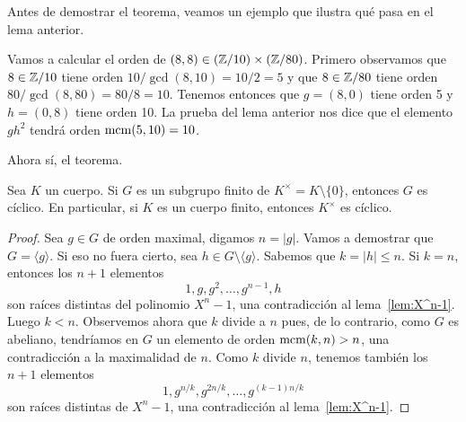 Antes de demostrar el teorema, veamos un ejemplo que ilustra qué pasa en el lema anterior.

\begin{example}
Vamos a calcular el orden de $(8,8)\in(\mathbb{Z}/10)\times(\mathbb{Z}/80)$. Primero observamos que 
$8\in\mathbb{Z}/10$ tiene orden $10/\gcd(8,10)=10/2=5$ y que $8\in\mathbb{Z}/80$ tiene orden
$80/\gcd(8,80)=80/8=10$. Tenemos entonces que $g=(8,0)$ tiene orden 5 y $h=(0,8)$ tiene orden 10. La prueba del lema anterior nos dice que
el elemento $gh^2$ tendrá orden $\operatorname{mcm}(5,10)=10$.   
\end{example}

Ahora sí, el teorema. 

\begin{theorem}
Sea $K$ un cuerpo. Si $G$ es un subgrupo finito de $K^\times=K\setminus\{0\}$, entonces $G$ es cíclico. En particular, si $K$ es un cuerpo finito, entonces $K^\times$ es cíclico.  
\end{theorem}

\begin{proof}
Sea $g\in G$ de orden maximal, digamos $n=|g|$. Vamos a demostrar que $G=\langle g\rangle$. Si eso no fuera cierto, 
sea $h\in G\setminus\langle g\rangle$. Sabemos que $k=|h|\leq n$. Si $k=n$, entonces los $n+1$ elementos
\[
1,g,g^2,\dots,g^{n-1},h
\]
son raíces distintas del polinomio $X^n-1$, una contradicción al lema~\ref{lem:X^n-1}.  
Luego $k<n$. Observemos ahora que $k$ divide a $n$ pues, de lo contrario, 
como $G$ es abeliano, tendríamos en $G$ un elemento de orden 
$\operatorname{mcm}(k,n)>n$, una contradicción a la maximalidad de $n$. Como $k$ divide $n$, tenemos 
también los $n+1$ elementos 
\[
1,g^{n/k},g^{2n/k},\dots,g^{(k-1)n/k}
\]
son raíces distintas de $X^n-1$, una contradicción al lema~\ref{lem:X^n-1}. 
\end{proof}
